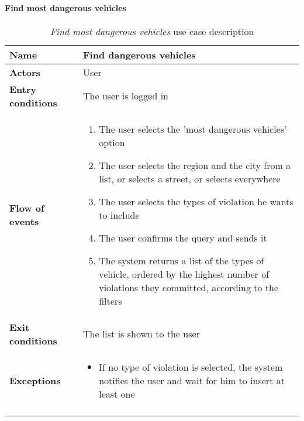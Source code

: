 		\paragraph{Find most dangerous vehicles}
		\begin{longtable}{p{0.25\linewidth}p{0.75\linewidth}}
			\toprule
			\textbf{Name} & \textbf{Find dangerous vehicles} \\
			\midrule
			\textbf{Actors} & User \\
			\midrule
			\textbf{Entry conditions} & The user is logged in \\
			\midrule
			\textbf{Flow of events} & 
			\begin{enumerate}
				\item The user selects the 'most dangerous vehicles' option
				\item The user selects the region and the city from a list, or selects a street, or selects everywhere
				\item The user selects the types of violation he wants to include
				\item The user confirms the query and sends it
				\item The system returns a list of the types of vehicle, ordered by the highest number of violations they committed, according to the filters
			\end{enumerate} \\
			\midrule
			\textbf{Exit conditions} & The list is shown to the user\\
			\midrule
			\textbf{Exceptions} & 
			\begin{itemize}
				\item 	If no type of violation is selected, the system notifies the user and wait for him to insert at least one	
			\end{itemize} \\
			\bottomrule
			\caption{\emph{Find most dangerous vehicles} use case description}
		\end{longtable}
		
